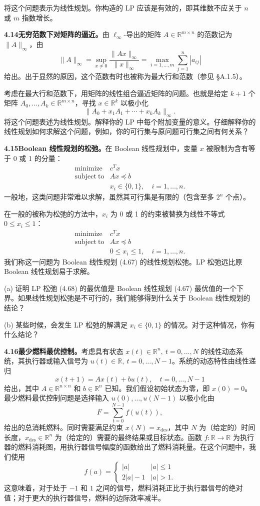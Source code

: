 \documentclass[UTF8,12pt,a4paper,fontset=fandol]{ctexart}
\begin{document}
将这个问题表示为线性规划。你构造的 LP 应该是有效的，即其维数不应关于 $n$ 或 $m$ 指数增长。

\noindent\textbf{4.14\quad 无穷范数下对矩阵的逼近。}\quad 由 $\ell_\infty$-导出的矩阵 $A\in\mathbb{R}^{m\times n}$ 的范数记为 $\|A\|_\infty$，由
\[
\|A\|_\infty=\sup_{x\neq0}\frac{\|Ax\|_\infty}{\|x\|_\infty}=\max_{i=1,\ldots,m}\sum_{j=1}^n |a_{ij}|
\]
给出。出于显然的原因，这个范数有时也被称为最大行和范数（参见 \S A.1.5）。

考虑在最大行和范数下，用矩阵的线性组合逼近矩阵的问题。也就是给定 $k+1$ 个矩阵 $A_0,\ldots,A_k\in\mathbb{R}^{m\times n}$，寻找 $x\in\mathbb{R}^k$ 以极小化
\[
\|A_0+x_1A_1+\cdots+x_kA_k\|_\infty.
\]
将这个问题表述为线性规划。解释你的 LP 中每个附加变量的意义。仔细解释你的线性规划如何求解这个问题，例如，你的可行集与原问题可行集之间有何关系？

\noindent\textbf{4.15\quad Boolean 线性规划的松弛。}\quad 在 Boolean 线性规划中，变量 $x$ 被限制为含有等于 0 或 1 的分量：
\[
\begin{array}{ll}
\mathop{\mathrm{minimize}} & c^Tx\\
\mathrm{subject\ to} & Ax\preceq b\\
& x_i\in\{0,1\},\quad i=1,\ldots,n.
\end{array}
\tag{4.67}
\]
一般地，这类问题非常难以求解，虽然其可行集是有限的（包含至多 $2^n$ 个点）。

在一般的被称为松弛的方法中，$x_i$ 为 0 或 1 的约束被替换为线性不等式 $0\leq x_i\leq1$：
\[
\begin{array}{ll}
\mathop{\mathrm{minimize}} & c^Tx\\
\mathrm{subject\ to} & Ax\preceq b\\
& 0\leq x_i\leq1,\quad i=1,\ldots,n.
\end{array}
\tag{4.68}
\]
我们称这一问题为 Boolean 线性规划 (4.67) 的线性规划松弛。LP 松弛远比原 Boolean 线性规划易于求解。

(a) 证明 LP 松弛 (4.68) 的最优值是 Boolean 线性规划 (4.67) 最优值的一个下界。如果线性规划松弛是不可行的，我们能够得到什么关于 Boolean 线性规划的结论？

(b) 某些时候，会发生 LP 松弛的解满足 $x_i\in\{0,1\}$ 的情况。对于这种情况，你有什么结论？

\noindent\textbf{4.16\quad 最少燃料最优控制。}\quad 考虑具有状态 $x(t)\in\mathbb{R}^n,\ t=0,\ldots,N$ 的线性动态系统，其执行器或输入信号为 $u(t)\in\mathbb{R},\ t=0,\ldots,N-1$。系统的动态特性由线性递归
\[
x(t+1)=Ax(t)+bu(t),\quad t=0,\ldots,N-1
\]
给出，其中 $A\in\mathbb{R}^{n\times n}$ 和 $b\in\mathbb{R}^n$ 已知。我们假设初始状态为零，即 $x(0)=0$。最少燃料最优控制问题是选择输入 $u(0),\ldots,u(N-1)$ 以极小化由
\[
F=\sum_{t=0}^{N-1} f(u(t)),
\]
给出的总消耗燃料。同时需要满足约束 $x(N)=x_{\mathrm{des}}$，其中 $N$ 为（给定的）时间长度，$x_{\mathrm{des}}\in\mathbb{R}^n$ 为（给定的）需要的最终结果或目标状态。函数 $f:\mathbb{R}\to\mathbb{R}$ 为执行器的燃料消耗图，用执行器信号幅度的函数给出了燃料消耗量。在这个问题中，我们使用
\[
f(a)=
\begin{cases}
|a| & |a|\leq1\\
2|a|-1 & |a|>1.
\end{cases}
\]
这意味着，对于处于 $-1$ 和 $1$ 之间的信号，燃料消耗正比于执行器信号的绝对值；对于更大的执行器信号，燃料的边际效率减半。
\end{document}
